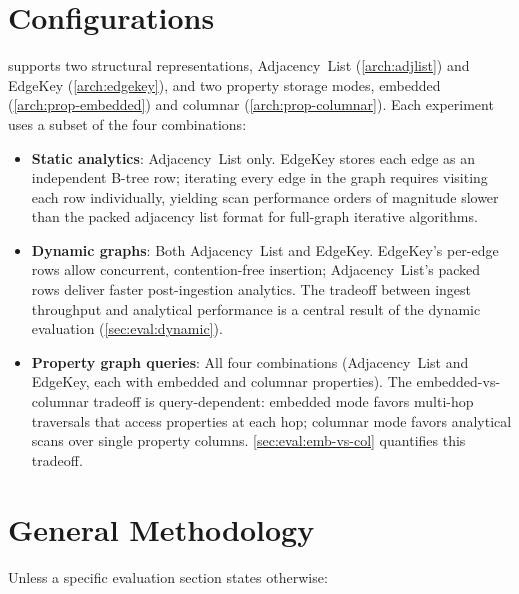 \section{\project{} Configurations}
\label{sec:eval:configs}

\project{} supports two structural representations, Adjacency~List (\autoref{arch:adjlist}) and EdgeKey (\autoref{arch:edgekey}), and two property storage modes, embedded (\autoref{arch:prop-embedded}) and columnar
(\autoref{arch:prop-columnar}).
Each experiment uses a subset of the four combinations:

\begin{itemize}
  \item \textbf{Static analytics}: Adjacency~List only.
        EdgeKey stores each edge as an independent B-tree row; iterating every edge in the graph requires visiting each row individually, yielding scan performance orders of magnitude slower than the packed adjacency
        list format for full-graph iterative algorithms.

  \item \textbf{Dynamic graphs}: Both Adjacency~List and EdgeKey. 
        EdgeKey's per-edge rows allow concurrent, contention-free insertion; Adjacency~List's packed rows deliver faster post-ingestion analytics.
        The tradeoff between ingest throughput and analytical performance is a central result of the dynamic evaluation (\autoref{sec:eval:dynamic}).

  \item \textbf{Property graph queries}: All four combinations (Adjacency~List and EdgeKey, each with embedded and columnar properties).
        The embedded-vs-columnar tradeoff is query-dependent: embedded mode favors multi-hop traversals that access properties at each hop; columnar mode favors analytical scans over single property columns.
        \autoref{sec:eval:emb-vs-col} quantifies this tradeoff.
\end{itemize}

\section{General Methodology}
\label{sec:eval:methodology}

Unless a specific evaluation section states otherwise:

